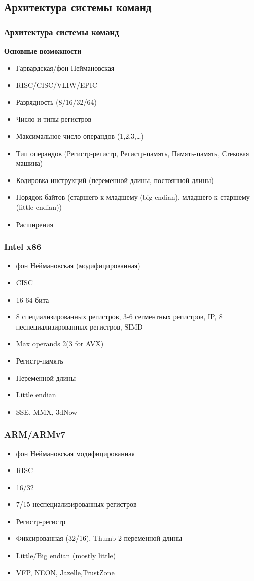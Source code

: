 \subsection{Архитектура системы команд}
\begin{frame}
 \frametitle{Архитектура системы команд}
 \begin{center}
   {\bf\large Основные возможности}
 \end{center}
 \begin{itemize}
     \item Гарвардская/фон Неймановская
     \item RISC/CISC/VLIW/EPIC
     \item Разрядность (8/16/32/64)
     \item Число и типы регистров
     \item Максимальное число операндов (1,2,3,\dots) 
     \item Тип операндов (Регистр-регистр, Регистр-память, Память-память, Стековая машина)
     \item Кодировка инструкций (переменной длины, постоянной длины)
     \item Порядок байтов (старшего к младшему (big endian), младшего к старшему (little endian))
     \item Расширения
 \end{itemize}
\end{frame}

\begin{frame}
  \frametitle{Intel x86}
  \begin{itemize}
    \item фон Неймановская (модифицированная)
    \item CISC
    \item 16-64 бита 
    \item 8 специализированных регистров, 3-6 сегментных регистров, IP, 8 неспециализированных регистров, SIMD
    \item Max operands 2(3 for AVX)
    \item Регистр-память
    \item Переменной длины
    \item Little endian
    \item SSE, MMX, 3dNow
  \end{itemize}
\end{frame}

\begin{frame}
  \frametitle{ARM/ARMv7}
  \begin{itemize}
      \item фон Неймановская модифицированная
      \item RISC
      \item 16/32
      \item 7/15 неспециализированных регистров
      \item Регистр-регистр
      \item Фиксированная (32/16), Thumb-2 переменной длины
      \item Little/Big endian (mostly little)
      \item VFP, NEON, Jazelle,TrustZone
  \end{itemize}
\end{frame}

